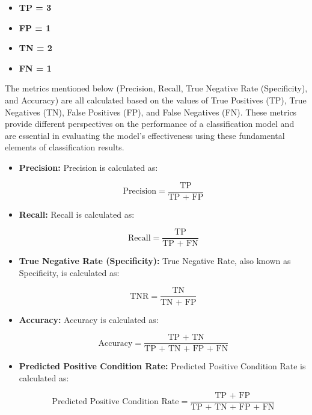 \documentclass[a4paper,conference]{IEEEtran}
\newenvironment{Shaded}{\begin{snugshade}}{\end{snugshade}}
\newcommand{\CommentTok}[1]{\textcolor[rgb]{0.56,0.35,0.01}{\textit{#1}}}
\newcommand{\FunctionTok}[1]{\textcolor[rgb]{0.13,0.29,0.53}{\textbf{#1}}}
\newcommand{\NormalTok}[1]{#1}
\newcommand{\OtherTok}[1]{\textcolor[rgb]{0.56,0.35,0.01}{#1}}
\newcommand{\SpecialCharTok}[1]{\textcolor[rgb]{0.81,0.36,0.00}{\textbf{#1}}}
\newcommand{\StringTok}[1]{\textcolor[rgb]{0.31,0.60,0.02}{#1}}
\let\tightlist\relax %
\begin{document}
\begin{itemize}
\tightlist
\item
  \textbf{TP = 3}
\item
  \textbf{FP = 1}
\item
  \textbf{TN = 2}
\item
  \textbf{FN = 1}
\end{itemize}

The metrics mentioned below (Precision, Recall, True Negative Rate
(Specificity), and Accuracy) are all calculated based on the values of
True Positives (TP), True Negatives (TN), False Positives (FP), and
False Negatives (FN). These metrics provide different perspectives on
the performance of a classification model and are essential in
evaluating the model's effectiveness using these fundamental elements of
classification results.

\begin{itemize}
\item
  \textbf{Precision:} Precision is calculated as:

  \[
  \text{Precision} = \frac{\text{TP}}{\text{TP + FP}}
  \]
\item
  \textbf{Recall:} Recall is calculated as:

  \[
  \text{Recall} = \frac{\text{TP}}{\text{TP + FN}}
  \]
\item
  \textbf{True Negative Rate (Specificity):} True Negative Rate, also
  known as Specificity, is calculated as:

  \[
  \text{TNR} = \frac{\text{TN}}{\text{TN + FP}}
  \]
\item
  \textbf{Accuracy:} Accuracy is calculated as:

  \[
  \text{Accuracy} = \frac{\text{TP + TN}}{\text{TP + TN + FP + FN}}
  \]
\item
  \textbf{Predicted Positive Condition Rate:} Predicted Positive
  Condition Rate is calculated as:

  \[
  \text{Predicted Positive Condition Rate} = \frac{\text{TP + FP}}{\text{TP + TN + FP + FN}}
  \]
\end{itemize}

\begin{Shaded}
\end{Shaded}
\end{document}

